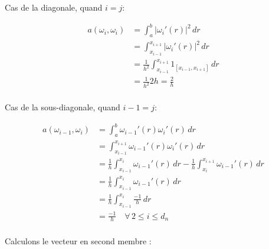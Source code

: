 \documentclass{article}
\newcommand{\Abs}[1]{ \left| #1 \right| }
\newcommand{\Integral}[4]{ \int_{#1}^{#2} #3 \, d#4 }
\begin{document}
{    Cas de la diagonale, quand $i = j$:

    \begin{align*}
        a(\omega_i, \omega_i) &= \Integral{a}{b}{ \Abs{\omega_i'(r)}^2 }{r} \\
        &= \Integral{x_{i-1}}{x_{i+1}}{ \Abs{\omega_i'(r)}^2 }{r} \\
        &= \frac{1}{h^2} \Integral{x_{i-1}}{x_{i+1}}{ 1_{[x_{i-1}, x_{i+1}]} }{r} \\
        &= \frac{1}{h^2} 2h = \frac{2}{h} \\
    \end{align*}
    
    Cas de la sous-diagonale, quand $i-1 = j$:

    \begin{align*}
        a(\omega_{i-1}, \omega_i) &= \Integral{a}{b}{ \omega_{i-1}'(r)\omega_i'(r) }{r} \\
        &= \Integral{x_{i-1}}{x_{i+1}}{ \omega_{i-1}'(r)\omega_i'(r) }{r} \\
        &= \frac{1}{h}\Integral{x_{i-1}}{x_{i}}{ \omega_{i-1}'(r) }{r} - \frac{1}{h}\Integral{x_{i}}{x_{i+1}}{ \omega_{i-1}'(r) }{r} \\
        &= \frac{1}{h}\Integral{x_{i-1}}{x_{i}}{ \omega_{i-1}'(r) }{r} \\
        &= \frac{1}{h}\Integral{x_{i-1}}{x_{i}}{ \frac{-1}{h} }{r} \\
        &= \frac{-1}{h} \quad \forall \, 2 \leq i \leq d_n\\
    \end{align*}

    Calculons le vecteur en second membre :

}
\end{document}
